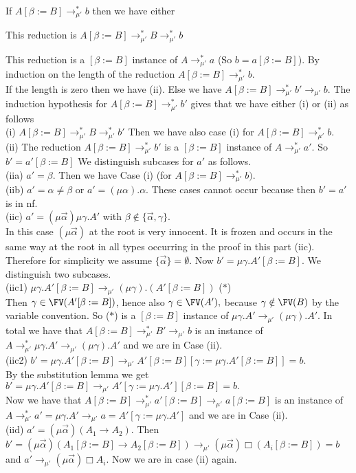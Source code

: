 \documentclass[11pt,aslarticle,xperspectives,bibay3]{asl}
\newcommand\redmua{\mathrel{\rightarrow_{\mu'}}}
\newcommand\redmuastar{\mathrel{\rightarrow^{\ast}_{\mu'}}}
\newcommand\alphaarrow{\vec{\alpha}}
\begin{document}
{\blem\label{onredmua} If $A[\beta := B]\redmuastar b$ then we have either
\bsub\item This reduction is $A[\beta := B]\redmuastar B\redmuastar b$
\item This reduction is a $[\beta := B]$ instance of $A\redmuastar a$    (So $b=a[\beta := B]$).
\esub
\elem
\bpf By induction on the length of the reduction $A[\beta := B]\redmuastar b$.\\
If the length is zero then we have (ii). Else we have $A[\beta := B]\redmuastar b'\redmua b$. The induction hypothesis for $A[\beta := B]\redmuastar b'$ gives that we have either (i) or (ii) as follows\\[1em]
(i) $A[\beta := B]\redmuastar B\redmuastar b'$  Then we have also case (i) for $A[\beta := B]\redmuastar b$.\\[1em] 
(ii) The reduction $A[\beta := B]\redmuastar b'$ is a $[\beta := B]$ instance of $A\redmuastar a'.$    So $b'=a'[\beta := B]$  We distinguish subcases for $a'$ as follows.\\[1em]
(iia)  $a'=\beta.$  Then we have Case (i) (for $A[\beta := B]\redmuastar b).$  \\[1em]
(iib)  $ a'=\alpha\neq\beta$ or $a'=(\mu\alpha).\alpha.$  These cases cannot occur because then $b'=a'$ is in nf.\\[1em]
(iic)  $a'=(\mu\alphaarrow)\mu\gamma.A'$ with $\beta\notin\{\alphaarrow,\gamma\}.$\\
In this case $(\mu\alphaarrow)$ at the root is very innocent. It is frozen and occurs in the same way at the root in all types occurring in the proof in this part (iic). Therefore for simplicity we assume $\{\alphaarrow\}=\emptyset.$ Now $b'=\mu\gamma.A'[\beta := B].$ We distinguish two subcases.\\[1em]
(iic1)  $\mu\gamma.A'[\beta := B]\redmua (\mu\gamma).(A'[\beta := B])$          ($\ast$)\\
Then $\gamma\in\FV(A'[\beta := B])$, hence also $\gamma\in\FV(A'),$ because $\gamma\notin\FV(B)$ by the variable convention. So ($\ast$) is a  $[\beta := B]$ instance of $\mu\gamma.A'\redmua (\mu\gamma).A'$. In total we have that $A[\beta := B]\redmuastar B'\redmua b$ is an instance of $A\redmuastar\mu\gamma.A'\redmua (\mu\gamma).A'$ and we are in Case (ii). \\[1em]
(iic2) $b'=\mu\gamma.A'[\beta := B]\redmua A'[\beta := B][\gamma :=\mu\gamma.A'[\beta := B]] = b.$\\
By the substitution lemma we get $b'=\mu\gamma.A'[\beta := B]\redmua A'[\gamma :=\mu\gamma.A'][\beta := B] =b.$ \\
Now we have that $A[\beta := B]\redmuastar a'[\beta := B]\redmua a[\beta := B]$ is an instance of $A\redmuastar a'=\mu\gamma.A'\redmua a=A'[\gamma :=\mu\gamma.A']$ and we are in Case (ii).\\[1em]
(iid) $a'=(\mu\alphaarrow)(A_1\to A_2).$ Then $b'=(\mu\alphaarrow)(A_1[\beta := B]\to A_2[\beta := B])\redmua (\mu\alphaarrow)\Box(A_i[\beta := B]) = b$ and $a'\redmua (\mu\alphaarrow)\Box A_i$. Now we are in case (ii) again.
\epf

}
\end{document}
